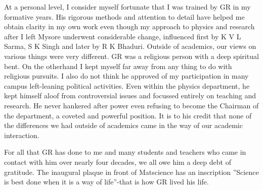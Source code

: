 At a personal level, I consider myself fortunate that I was trained by GR in my formative years. His rigorous methods and attention to detail have helped me obtain clarity in my own work even though my approach to physics and research after I left Mysore underwent considerable change, influenced first by K V L Sarma, S K Singh and later by R K Bhaduri. Outside of academics, our views on various things were very different. GR was a religious person with a deep spiritual bent. On the otherhand I kept myself far away from any thing to do with religious pursuits. I also do not think he approved of my participation in many campus left-leaning political activities. Even within the physics department, he kept himself aloof from controversial issues and focussed entirely on teaching and research. He never hankered after power even refusing to become the Chairman of the department, a coveted and powerful position. It is to his credit that none of the differences we had outside of academics came in the way of our academic interaction.

For all that GR has done to me and many students and teachers who came in contact with him over nearly four decades, we all owe him a deep debt of gratitude. The inaugural plaque in front of Matscience has an inscription ”Science is best done when it is a way of life”-that is how GR lived his life.

